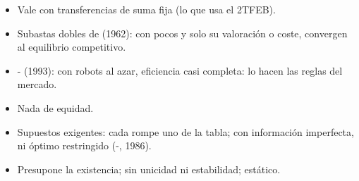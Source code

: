 \documentclass{article}
\begin{document}
\begin{columnas}
\begin{itemize}
\begin{itemize}
  \end{itemize}
\item Vale con transferencias de suma fija (lo que usa el 2TFEB).
\end{itemize}
\begin{itemize}
\item Subastas dobles de  (1962): con pocos y solo su valoración o coste, convergen al equilibrio competitivo.
\item {}- (1993): con robots al azar, eficiencia casi completa: lo hacen las reglas del mercado.
\end{itemize}
\begin{itemize}
\item Nada de equidad.
\item Supuestos exigentes: cada  rompe uno de la tabla; con información imperfecta, ni óptimo restringido (-, 1986).
\item Presupone la existencia; sin unicidad ni estabilidad; estático.
\end{itemize}


\end{columnas}
\end{document}
